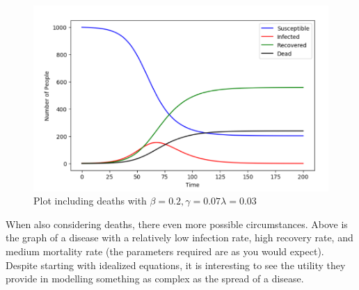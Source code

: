 \documentclass{article}
\begin{document}
\begin{figure}[h]
  \centering
\includegraphics[scale=0.4]{Graph 5}
\caption{Plot including deaths with $\beta = 0.2, \gamma = 0.07 \lambda = 0.03$}
\end{figure}

When also considering deaths, there even more possible circumstances. Above is the
graph of a disease with a relatively low infection rate, high recovery rate,
and medium mortality rate (the parameters required are as you would expect). Despite starting with idealized equations, it is interesting to see the utility they provide in modelling something as complex as the spread of a disease.
\end{document}
